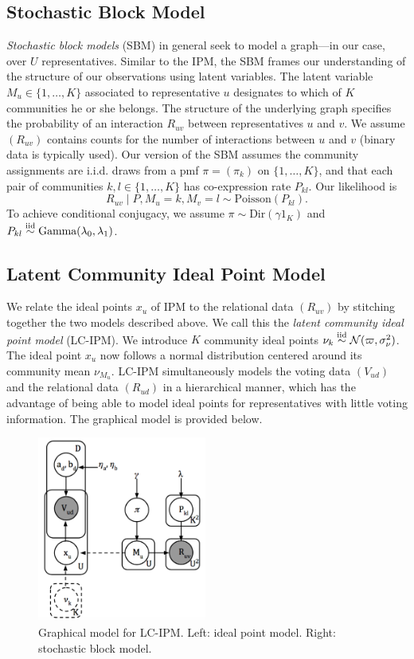 \documentclass{article}
\begin{document}
\subsection{Stochastic Block Model}

{\sl Stochastic block models} (SBM) \cite{Snijders1997} in general seek to model a graph---in our case, over $U$ representatives. Similar to the IPM, the SBM frames our understanding of the structure of our observations using latent variables. The latent variable $M_u\in\{1,\dots,K\}$ associated to representative $u$ designates to which of $K$ communities he or she belongs. The structure of the underlying graph specifies the probability of an interaction $R_{uv}$ between representatives $u$ and $v$. We assume $(R_{uv})$ contains counts for the number of interactions between $u$ and $v$ (binary data is typically used). Our version of the SBM assumes the community assignments are i.i.d. draws from a pmf $\pi = (\pi_k)$ on $\{1,\dots,K\}$, and that each pair of communities $k,l\in\{1,\dots, K\}$ has co-expression rate $P_{kl}$. Our likelihood is
\begin{equation}
R_{uv} \mid P, M_u=k, M_v=l\sim \text{Poisson}(P_{kl}).
\end{equation}
To achieve conditional conjugacy, we assume $\pi \sim \text{Dir}(\gamma1_K)$ and $P_{kl} \simiid \text{Gamma}(\lambda_0,\lambda_1)$.


\subsection{Latent Community Ideal Point Model}

We relate the ideal points $x_u$ of IPM to the relational data $(R_{uv})$ by stitching together the two models described above. We call this the {\sl latent community ideal point model} (LC-IPM). We introduce $K$ community ideal points $\nu_k\simiid\cn(\varpi,\sigma^2_\nu)$. The ideal point $x_u$ now follows a normal distribution centered around its community mean $\nu_{M_u}$. LC-IPM simultaneously models the voting data $(V_{ud})$ and the relational data $(R_{ud})$ in a hierarchical manner, which has the advantage of being able to model ideal points for representatives with little voting information. The graphical model is provided below.


\begin{figure}[h]
  \centering
        \includegraphics[width=15em]{lcipm2.png}
  \caption{Graphical model for LC-IPM. Left: ideal point model. Right: stochastic block model.}
      \label{fig:pgm}
\end{figure}
\end{document}
